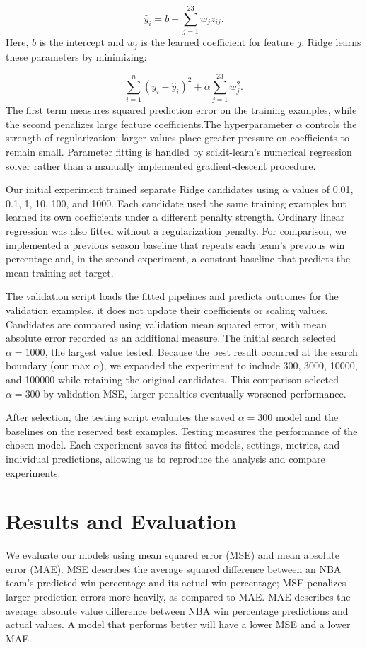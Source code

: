 \documentclass[11pt]{article}
\begin{document}
\[
\hat{y}_i=b+\sum_{j=1}^{23}w_jz_{ij}.
\]
Here, $b$ is the intercept and $w_j$ is the learned coefficient for feature $j$. Ridge learns these parameters by minimizing:

\[
\sum_{i=1}^{n}(y_i-\hat{y}_i)^2+\alpha\sum_{j=1}^{23}w_j^2.
\]
The first term measures squared prediction error on the training examples, while the second penalizes large feature coefficients.The hyperparameter $\alpha$ controls the strength of regularization: larger values place greater pressure on coefficients to remain small. Parameter fitting is handled by scikit-learn’s numerical regression solver rather than a manually implemented gradient-descent procedure.
\medskip

Our initial experiment trained separate Ridge candidates using $\alpha$ values of 0.01, 0.1, 1, 10, 100, and 1000. Each candidate used the same training examples but learned its own coefficients under a different penalty strength. Ordinary linear regression was also fitted without a regularization penalty. For comparison, we implemented a previous season baseline that repeats each team’s previous win percentage and, in the second experiment, a constant baseline that predicts the mean training set target.
\medskip

The validation script loads the fitted pipelines and predicts outcomes for the validation examples, it does not update their coefficients or scaling values. Candidates are compared using validation mean squared error, with mean absolute error recorded as an additional measure. The initial search selected $\alpha=1000$, the largest value tested. Because the best result occurred at the search boundary (our max $\alpha$), we expanded the experiment to include 300, 3000, 10000, and 100000 while retaining the original candidates. This comparison selected $\alpha=300$ by validation MSE, larger penalties eventually worsened performance.
\medskip

After selection, the testing script evaluates the saved $\alpha=300$ model and the baselines on the reserved test examples. Testing measures the performance of the chosen model. Each experiment saves its fitted models, settings, metrics, and individual predictions, allowing us to reproduce the analysis and compare experiments.


\section{Results and Evaluation}

We evaluate our models using mean squared error (MSE) and mean absolute error (MAE). MSE describes the average squared difference between an NBA team's predicted win percentage and its actual win percentage; MSE penalizes larger prediction errors more heavily, as compared to MAE. MAE describes the average absolute value difference between NBA win percentage predictions and actual values. A model that performs better will have a lower MSE and a lower MAE.
\medskip
\end{document}
